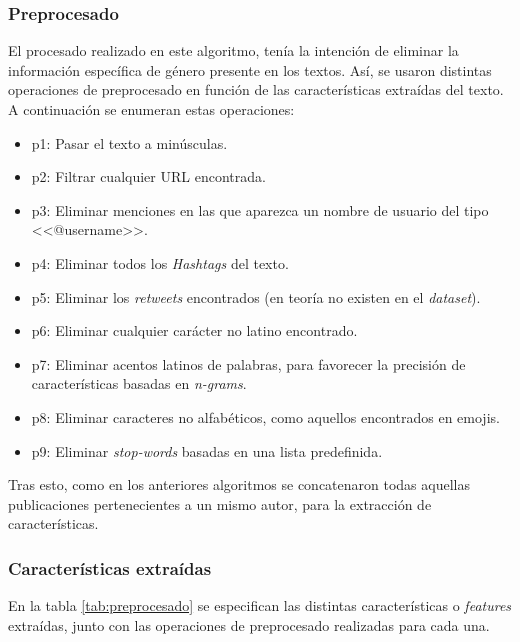 \subsubsection{Preprocesado}

El procesado realizado en este algoritmo, tenía la intención de eliminar la información específica de género presente en los textos. Así, se usaron distintas operaciones de preprocesado en función de las características extraídas del texto. A continuación se enumeran estas operaciones:

\begin{itemize}
    \item p1: Pasar el texto a minúsculas.
    \item p2: Filtrar cualquier URL encontrada.
    \item p3: Eliminar menciones en las que aparezca un nombre de usuario del tipo <<@username>>.
    \item p4: Eliminar todos los \textit{Hashtags} del texto.
    \item p5: Eliminar los \textit{retweets} encontrados (en teoría no existen en el \textit{dataset}).
    \item p6: Eliminar cualquier carácter no latino encontrado.
    \item p7: Eliminar acentos latinos de palabras, para favorecer la precisión de características basadas en \textit{n-grams}.
    \item p8: Eliminar caracteres no alfabéticos, como aquellos encontrados en emojis.
    \item p9: Eliminar \textit{stop-words} basadas en una lista predefinida. 
\end{itemize}

Tras esto, como en los anteriores algoritmos se concatenaron todas aquellas publicaciones pertenecientes a un mismo autor, para la extracción de características.

\subsubsection{Características extraídas}

En la tabla \ref{tab:preprocesado} se especifican las distintas características o \textit{features} extraídas, junto con las operaciones de preprocesado realizadas para cada una.

